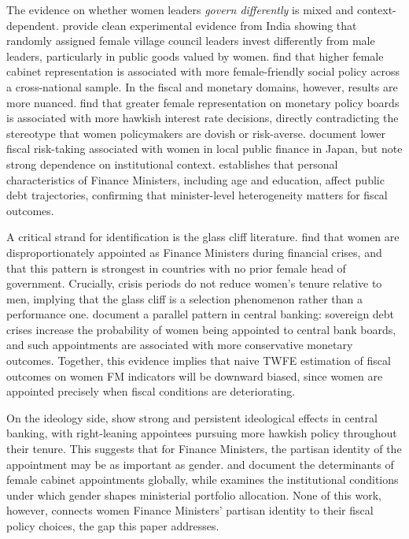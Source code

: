 \documentclass[12pt]{article}
\begin{document}
The evidence on whether women leaders \textit{govern differently} is mixed and
context-dependent. \citet{chattopadhyay2004} provide clean experimental evidence
from India showing that randomly assigned female village council leaders invest
differently from male leaders, particularly in public goods valued by women.
\citet{atchison2009} find that higher female cabinet representation is associated
with more female-friendly social policy across a cross-national sample. In the
fiscal and monetary domains, however, results are more nuanced.
\citet{masciandaro2020} find that greater female representation on monetary
policy boards is associated with more hawkish interest rate decisions, directly
contradicting the stereotype that women policymakers are dovish or risk-averse.
\citet{suzuki2018} document lower fiscal risk-taking associated with women in
local public finance in Japan, but note strong dependence on institutional
context. \citet{moessinger2012} establishes that personal characteristics of
Finance Ministers, including age and education, affect public debt trajectories,
confirming that minister-level heterogeneity matters for fiscal outcomes.

A critical strand for identification is the glass cliff literature.
\citet{armstrong2024} find that women are disproportionately appointed as
Finance Ministers during financial crises, and that this pattern is strongest
in countries with no prior female head of government. Crucially, crisis periods
do not reduce women's tenure relative to men, implying that the glass cliff is
a selection phenomenon rather than a performance one. \citet{kern2025} document
a parallel pattern in central banking: sovereign debt crises increase the
probability of women being appointed to central bank boards, and such
appointments are associated with more conservative monetary outcomes. Together,
this evidence implies that naive TWFE estimation of fiscal outcomes on women FM
indicators will be downward biased, since women are appointed precisely when
fiscal conditions are deteriorating.

On the ideology side, \citet{vanommeren2021} show strong and persistent
ideological effects in central banking, with right-leaning appointees pursuing
more hawkish policy throughout their tenure. This suggests that for Finance
Ministers, the partisan identity of the appointment may be as important as
gender. \citet{krook2012} and \citet{obrien2015} document the determinants of
female cabinet appointments globally, while \citet{field2021} examines the
institutional conditions under which gender shapes ministerial portfolio
allocation. None of this work, however, connects women Finance Ministers'
partisan identity to their fiscal policy choices, the gap this paper addresses.
\end{document}
